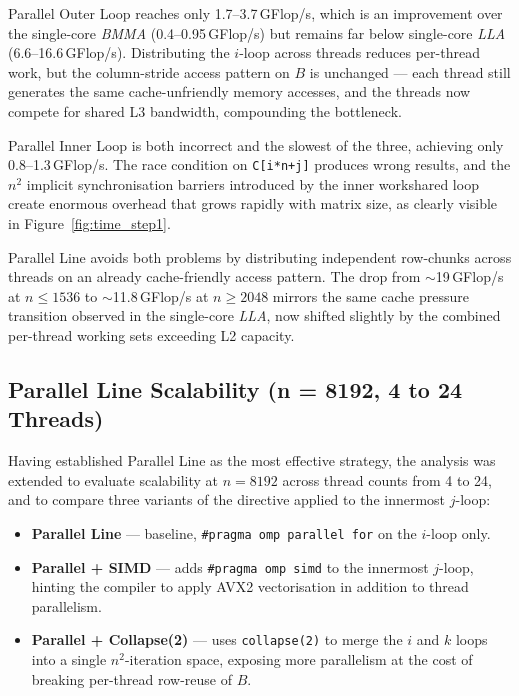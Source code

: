 \documentclass[12pt,a4paper]{article}
\begin{document}
Parallel Outer Loop reaches only 1.7--3.7\,GFlop/s, which is an improvement
over the single-core \textit{BMMA} (0.4--0.95\,GFlop/s) but remains far below
single-core \textit{LLA} (6.6--16.6\,GFlop/s). Distributing the $i$-loop
across threads reduces per-thread work, but the column-stride access pattern
on $B$ is unchanged --- each thread still generates the same cache-unfriendly
memory accesses, and the threads now compete for shared L3 bandwidth,
compounding the bottleneck.

Parallel Inner Loop is both incorrect and the slowest of the three, achieving
only 0.8--1.3\,GFlop/s. The race condition on \texttt{C[i*n+j]} produces
wrong results, and the $n^2$ implicit synchronisation barriers introduced by
the inner workshared loop create enormous overhead that grows rapidly with
matrix size, as clearly visible in Figure~\ref{fig:time_step1}.

Parallel Line avoids both problems by distributing independent row-chunks
across threads on an already cache-friendly access pattern. The drop from
$\sim$19\,GFlop/s at $n \leq 1536$ to $\sim$11.8\,GFlop/s at $n \geq 2048$
mirrors the same cache pressure transition observed in the single-core
\textit{LLA}, now shifted slightly by the combined per-thread working sets
exceeding L2 capacity.

\subsection{Parallel Line Scalability (n = 8192, 4 to 24 Threads)}
\label{subsec:par_scalability}

Having established Parallel Line as the most effective strategy, the analysis
was extended to evaluate scalability at $n = 8192$ across thread counts from 4
to 24, and to compare three variants of the directive applied to the innermost
$j$-loop:

\begin{itemize}
  \item \textbf{Parallel Line} --- baseline, \texttt{\#pragma omp parallel for}
        on the $i$-loop only.
  \item \textbf{Parallel + SIMD} --- adds \texttt{\#pragma omp simd} to the
        innermost $j$-loop, hinting the compiler to apply AVX2 vectorisation
        in addition to thread parallelism.
  \item \textbf{Parallel + Collapse(2)} --- uses \texttt{collapse(2)} to merge
        the $i$ and $k$ loops into a single $n^2$-iteration space, exposing
        more parallelism at the cost of breaking per-thread row-reuse of $B$.
\end{itemize}
\end{document}
